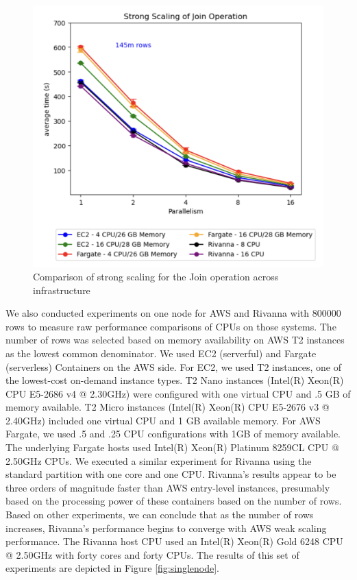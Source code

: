 \begin{figure}[ht]
    \begin{center}
    \includegraphics[width=\linewidth]{source/Figure/stongscal1.png}
    \end{center}
    \caption{Comparison of strong scaling for the Join operation across infrastructure}
    \label{fig:strongscaling1}
\end{figure}

We also conducted experiments on one node for AWS and Rivanna with 800000 rows to measure raw performance comparisons of CPUs on those systems.  The number of rows was selected based on memory availability on AWS T2 instances as the lowest common denominator.  We used EC2 (serverful) and Fargate (serverless) Containers on the AWS side.  For  EC2, we used T2 instances, one of the lowest-cost on-demand instance types.  T2 Nano instances (Intel(R) Xeon(R) CPU E5-2686 v4 @ 2.30GHz) were configured with one virtual CPU and .5 GB of memory available.  T2 Micro instances (Intel(R) Xeon(R) CPU E5-2676 v3 @ 2.40GHz) included one virtual CPU and 1 GB available memory.  For AWS Fargate, we used .5 and .25 CPU configurations with 1GB of memory available.  The underlying Fargate hosts used Intel(R) Xeon(R) Platinum 8259CL CPU @ 2.50GHz CPUs.  We executed a similar experiment for Rivanna using the standard partition with one core and one CPU.  Rivanna’s results appear to be three orders of magnitude faster than AWS entry-level instances, presumably based on the processing power of these containers based on the number of rows.  Based on other experiments, we can conclude that as the number of rows increases, Rivanna’s performance begins to converge with AWS weak scaling performance.  The Rivanna host CPU used an Intel(R) Xeon(R) Gold 6248 CPU @ 2.50GHz with forty cores and forty CPUs.  The results of this set of experiments are depicted in Figure \ref{fig:singlenode}.

